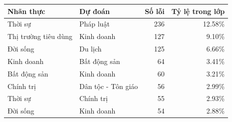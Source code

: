 \begin{tabularx}{\textwidth}{XXrr}\toprule
Nhãn thực & Dự đoán & Số lỗi & Tỷ lệ trong lớp\\\midrule
Thời sự & Pháp luật & 236 & 12.58\%\\
Thị trường tiêu dùng & Kinh doanh & 127 & 9.10\%\\
Đời sống & Du lịch & 125 & 6.66\%\\
Kinh doanh & Bất động sản & 64 & 3.41\%\\
Bất động sản & Kinh doanh & 60 & 3.21\%\\
Chính trị & Dân tộc - Tôn giáo & 56 & 2.99\%\\
Thời sự & Chính trị & 55 & 2.93\%\\
Đời sống & Kinh doanh & 54 & 2.88\%\\
\bottomrule\end{tabularx}
